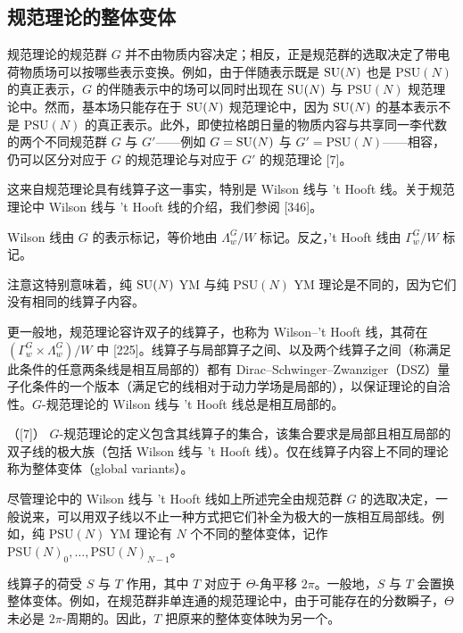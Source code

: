 \subsection{规范理论的整体变体}

规范理论的规范群 $G$ 并不由物质内容决定；相反，正是规范群的选取决定了带电荷物质场可以按哪些表示变换。例如，由于伴随表示既是 $\operatorname{SU}(N)$ 也是 $\mathrm{PSU}(N)$ 的真正表示，$G$ 的伴随表示中的场可以同时出现在 $\operatorname{SU}(N)$ 与 $\mathrm{PSU}(N)$ 规范理论中。然而，基本场只能存在于 $\operatorname{SU}(N)$ 规范理论中，因为 $\operatorname{SU}(N)$ 的基本表示不是 $\mathrm{PSU}(N)$ 的真正表示。此外，即使拉格朗日量的物质内容与共享同一李代数的两个不同规范群 $G$ 与 $G'$——例如 $G=\operatorname{SU}(N)$ 与 $G'=\mathrm{PSU}(N)$——相容，仍可以区分对应于 $G$ 的规范理论与对应于 $G'$ 的规范理论 [7]。

这来自规范理论具有线算子这一事实，特别是 Wilson 线与 't Hooft 线。关于规范理论中 Wilson 线与 't Hooft 线的介绍，我们参阅 [346]。


\begin{proposition}[19.25]
Wilson 线由 $G$ 的表示标记，等价地由 $\Lambda^G_w/W$ 标记。反之，'t Hooft 线由 $\Gamma^G_w/W$ 标记。
\end{proposition}

注意这特别意味着，纯 $\operatorname{SU}(N)$ YM 与纯 $\mathrm{PSU}(N)$ YM 理论是不同的，因为它们没有相同的线算子内容。

更一般地，规范理论容许双子的线算子，也称为 Wilson--'t Hooft 线，其荷在 $(\Gamma^G_w\times\Lambda^G_w)/W$ 中 [225]。线算子与局部算子之间、以及两个线算子之间（称满足此条件的任意两条线是相互局部的）都有 Dirac--Schwinger--Zwanziger（DSZ）量子化条件的一个版本（满足它的线相对于动力学场是局部的），以保证理论的自洽性。$G$-规范理论的 Wilson 线与 't Hooft 线总是相互局部的。

\begin{definition}[19.26]（{[7]}）
$G$-规范理论的定义包含其线算子的集合，该集合要求是局部且相互局部的双子线的极大族（包括 Wilson 线与 't Hooft 线）。仅在线算子内容上不同的理论称为整体变体（global variants）。
\end{definition}

尽管理论中的 Wilson 线与 't Hooft 线如上所述完全由规范群 $G$ 的选取决定，一般说来，可以用双子线以不止一种方式把它们补全为极大的一族相互局部线。例如，纯 $\mathrm{PSU}(N)$ YM 理论有 $N$ 个不同的整体变体，记作 $\mathrm{PSU}(N)_0,\dots,\mathrm{PSU}(N)_{N-1}$。

线算子的荷受 $S$ 与 $T$ 作用，其中 $T$ 对应于 $\Theta$-角平移 $2\pi$。一般地，$S$ 与 $T$ 会置换整体变体。例如，在规范群非单连通的规范理论中，由于可能存在的分数瞬子，$\Theta$ 未必是 $2\pi$-周期的。因此，$T$ 把原来的整体变体映为另一个。

